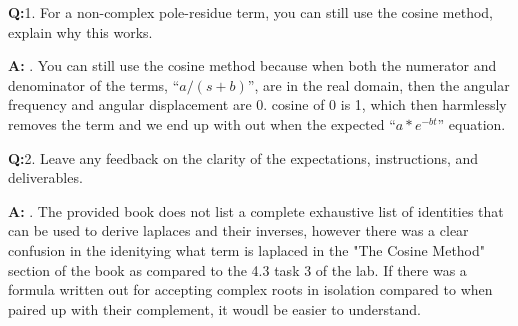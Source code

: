 \documentclass[12pt,a4paper]{article}
\newcommand{\Q}{\leavevmode\par\textbf {Q:}}
\newcommand{\A}{\par\textbf{A:} \normalfont}
\begin{document}
\Q 1. For a non-complex pole-residue term, you can still use the cosine method, explain why this works. 
\A 1. You can still use the cosine method because when both the numerator and denominator of the terms, ``$a / (s+b)$'', are in the real domain, then the angular frequency and angular displacement are 0. cosine of 0 is 1, which then harmlessly removes the term and we end up with out when the expected  ``$a*e^{-bt}$'' equation.


\Q 2. Leave any feedback on the clarity of the expectations, instructions, and  deliverables.
\A 2. The provided book does not list a complete exhaustive list of identities that can be used to derive laplaces and their inverses, however there was a clear confusion in the idenitying what term is laplaced in the "The Cosine  Method" section of the book as compared to the 4.3 task 3 of the lab.  If there was a formula written out for accepting complex roots in isolation  compared to when paired up with their complement, it woudl be easier to understand.





\end{document}
